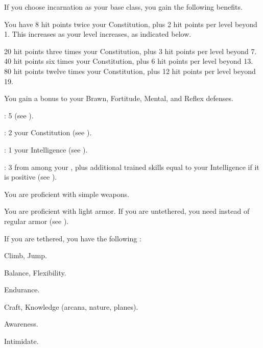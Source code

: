     If you choose incarnation as your base class, you gain the following benefits.

      You have 8 hit points \add twice your Constitution, plus 2 hit points per level beyond 1.
      This increases as your level increases, as indicated below.
      \begin{raggeditemize}
         20 hit points \add three times your Constitution, plus 3 hit points per level beyond 7.
         40 hit points \add six times your Constitution, plus 6 hit points per level beyond 13.
         80 hit points \add twelve times your Constitution, plus 12 hit points per level beyond 19.
      \end{raggeditemize}

      You gain a  bonus to your Brawn, Fortitude, Mental, and Reflex defenses.

      \begin{raggeditemize}
          \item {}: 5 (see ).
          \item {}: 2 \add your Constitution (see ).
          \item {}: 1 \add your Intelligence (see ).
          \item {}: 3 from among your , plus additional trained skills equal to your Intelligence if it is positive (see ).
      \end{raggeditemize}

      You are proficient with simple weapons.

      You are proficient with light armor.
      If you are untethered, you need  instead of regular armor (see ).

      If you are tethered, you have the following :
      \begin{raggeditemize}
        \item {} Climb, Jump.
        \item {} Balance, Flexibility.
        \item {} Endurance.
        \item {} Craft, Knowledge (arcana, nature, planes).
        \item {} Awareness.
        \item {} Intimidate.
      \end{raggeditemize}

